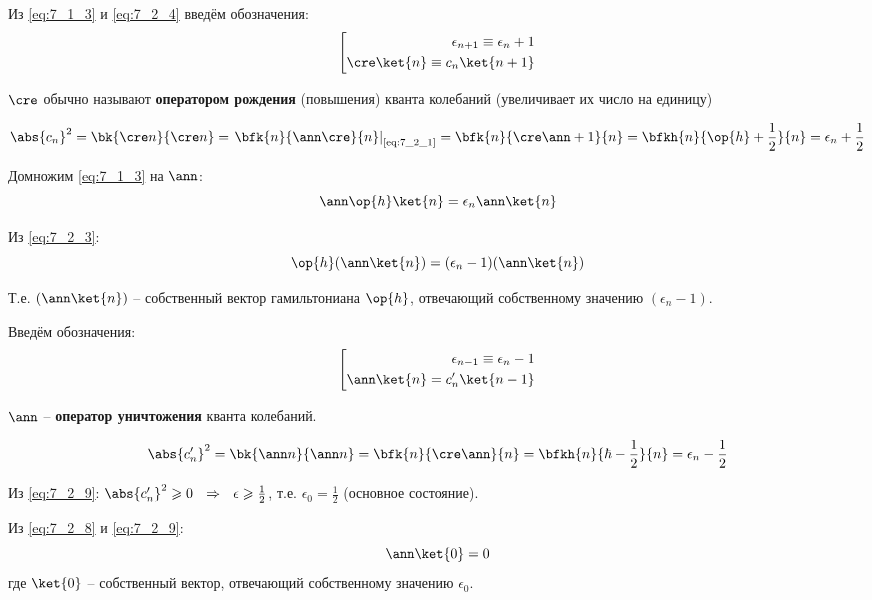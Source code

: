 Из \eqref{eq:7_1_3} и \eqref{eq:7_2_4} введём обозначения:
\begin{equation}
\label{eq:7_2_5}
\left[
\begin{aligned}
\epsilon_{n+1} \equiv \epsilon_n + 1 \\
\cre \ket{n} \equiv c_n \ket{n+1}
\end{aligned}
\right.
\end{equation}

$\cre$ обычно называют \textbf{оператором рождения} (повышения) кванта колебаний (увеличивает их число на единицу)

\begin{equation}
\label{eq:7_2_6}
\abs{c_n}^2 = \bk{\cre n}{\cre n} = \left. \bfk{n}{\ann\cre}{n} \right|_{\text{\eqref{eq:7_2_1}}} = \bfk{n}{\cre\ann + 1}{n} = \bfkh{n}{\op{h} + \frac{1}{2}}{n} = \epsilon_n + \frac{1}{2}
\end{equation}

Домножим \eqref{eq:7_1_3} на $\ann$:
$$
\ann\op{h} \ket{n} = \epsilon_n \ann \ket{n}
$$

Из \eqref{eq:7_2_3}:
\begin{equation}
\label{eq:7_2_7}
\op{h}(\ann\ket{n}) = (\epsilon_n - 1)(\ann \ket{n})
\end{equation}

Т.е. $(\ann\ket{n})$ -- собственный вектор гамильтониана $\op{h}$, отвечающий собственному значению $(\epsilon_n - 1)$.

Введём обозначения:
\begin{equation}
\label{eq:7_2_8}
\left[
\begin{aligned}
\epsilon_{n-1} \equiv \epsilon_n - 1 \\
\ann \ket{n} = c_{n}' \ket{n-1}
\end{aligned}
\right.
\end{equation}

$\ann$ -- \textbf{оператор уничтожения} кванта колебаний.

\begin{equation}
\label{eq:7_2_9}
\abs{c_n'}^2 = \bk{\ann n}{\ann n} = \bfk{n}{\cre\ann}{n} = \bfkh{n}{\hbar - \frac{1}{2}}{n} = \epsilon_n - \frac{1}{2}
\end{equation}

Из \eqref{eq:7_2_9}: $\abs{c_n'}^2 \geqslant 0 ~~\Rightarrow~~ \epsilon \geqslant \frac{1}{2}$, т.е. $\epsilon_0 = \frac{1}{2}$ (основное состояние).

Из \eqref{eq:7_2_8} и \eqref{eq:7_2_9}:
$$
	\ann \ket{0} = 0
$$
где $\ket{0}$ -- собственный вектор, отвечающий собственному значению $\epsilon_0$.

